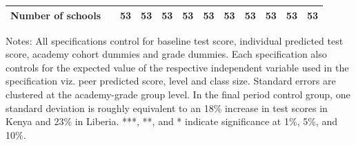 \begin{center}
\begin{scriptsize}
\begin{threeparttable}
\begin{tabular} {@{} l l c c c c c c c c c c  @{}}
Number of schools &  & 53 & 53 & 53 & 53 & 53 & 53 & 53 & 53 & 53 & 53 \\
\bottomrule
\end{tabular}
\begin{tablenotes}
\item Notes: All specifications control for baseline test score, individual predicted test score, academy cohort dummies and grade dummies. Each specification also controls for the expected value of the respective independent variable used in the specification viz. peer predicted score, level and class size. Standard errors are clustered at the academy-grade group level. In the final period control group, one standard deviation is roughly equivalent to an 18\% increase in test scores in Kenya and 23\% in Liberia. ***, **, and * indicate significance at 1\%, 5\%, and 10\%.\end{tablenotes}
\end{threeparttable}
\end{scriptsize}
\end{center}
\clearpage
